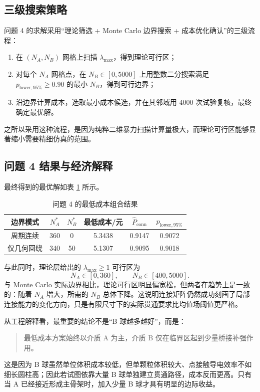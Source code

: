\subsection{三级搜索策略}

问题 4 的求解采用“理论筛选 + Monte Carlo 边界搜索 + 成本优化确认”的三级流程：
\begin{enumerate}
    \item 在 $(N_A,N_B)$ 网格上扫描 $\lambda_{\max}$，得到理论可行区；
    \item 对每个 $N_A$ 网格点，在 $N_B\in[0,5000]$ 上用整数二分搜索满足 $p_{\mathrm{lower},95\%}\ge 0.90$ 的最小 $N_B$，得到可行边界；
    \item 沿边界计算成本，选取最小成本候选，并在其邻域用 $4000$ 次试验复核，最终确定最优解。
\end{enumerate}
之所以采用这种流程，是因为纯粹二维暴力扫描计算量极大，而理论可行区能够显著缩小需要精细仿真的范围。

\subsection{问题 4 结果与经济解释}

最终得到的最优解如表 \ref{tab:q4_result} 所示。

\begin{table}[htbp]
    \centering
    \caption{问题 4 的最低成本组合结果}
    \label{tab:q4_result}
    \begin{tabular}{cccccc}
        \hline
        边界模式 & $N_A^\ast$ & $N_B^\ast$ & 最低成本/元 & $\hat{P}_{\mathrm{conn}}$ & $p_{\mathrm{lower},95\%}$ \\
        \hline
        周期连续 & 360 & 0  & 5.3438 & 0.9147 & 0.9072 \\
        仅几何回绕 & 340 & 50 & 5.1307 & 0.9095 & 0.9018 \\
        \hline
    \end{tabular}
\end{table}

与此同时，理论层给出的 $\lambda_{\max}\ge 1$ 可行区为
\[
N_A\in[0,360],\qquad N_B\in[400,5000].
\]
与 Monte Carlo 实际边界相比，理论可行区明显偏宽松，但两者在趋势上是一致的：随着 $N_A$ 增大，所需的 $N_B$ 总体下降。这说明连接矩阵仍然成功刻画了局部连接能力的变化方向，只是有限尺寸下的实际贯通要求比均值场阈值更严格。

从工程解释看，最重要的结论不是“B 球越多越好”，而是：
\begin{quote}
    最低成本方案始终以介质 A 为主，介质 B 仅在临界区起到少量桥接补强作用。
\end{quote}
这是因为 B 球虽然单位体积成本较低，但单颗粒体积较大、点接触导电效率不如细长圆柱高；因此若试图依靠大量 B 球单独建立贯通路径，成本反而更高。只有当 A 已经接近形成主骨架时，加入少量 B 球才具有明显的边际收益。

